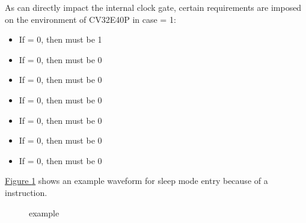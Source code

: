 \documentclass[letterpaper,10pt,english]{sphinxmanual}
\begin{document}
\sphinxAtStartPar
As  can directly impact the internal clock gate, certain requirements are imposed on the environment of CV32E40P
in case  = 1:
\begin{itemize}
\item {} 
\sphinxAtStartPar
If  = 0, then  must be 1

\item {} 
\sphinxAtStartPar
If  = 0, then  must be 0

\item {} 
\sphinxAtStartPar
If  = 0, then  must be 0

\item {} 
\sphinxAtStartPar
If  = 0, then  must be 0

\item {} 
\sphinxAtStartPar
If  = 0, then  must be 0

\item {} 
\sphinxAtStartPar
If  = 0, then  must be 0

\item {} 
\sphinxAtStartPar
If  = 0, then  must be 0

\end{itemize}

\sphinxAtStartPar
\hyperref[\detokenize{sleep:load-event-example}]{Figure \ref{\detokenize{sleep:load-event-example}}} shows an example waveform for sleep mode entry because of a  instruction.

\begin{figure}[htbp]
\centering
\capstart

\noindent{}
\caption{ example}\label{\detokenize{sleep:load-event-example}}\end{figure}

\sphinxstepscope
\end{document}
